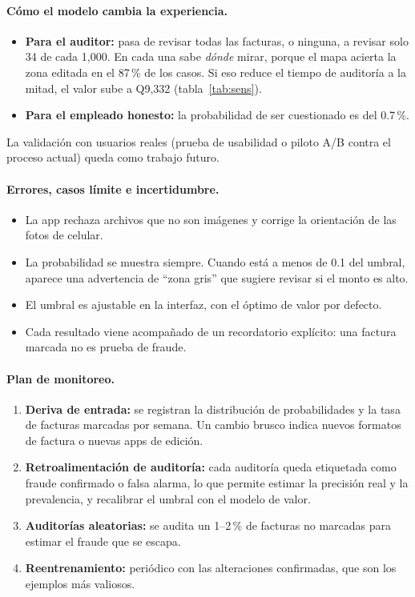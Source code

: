 \documentclass[11pt,letterpaper]{article}
\begin{document}
\paragraph{Cómo el modelo cambia la experiencia.}
\begin{itemize}
  \item \textbf{Para el auditor:} pasa de revisar todas las facturas, o ninguna, a revisar solo 34 de cada 1,000. En cada una sabe \emph{dónde} mirar, porque el mapa acierta la zona editada en el 87\,\% de los casos. Si eso reduce el tiempo de auditoría a la mitad, el valor sube a Q9,332 (tabla~\ref{tab:sens}).
  \item \textbf{Para el empleado honesto:} la probabilidad de ser cuestionado es del 0.7\,\%.
\end{itemize}
La validación con usuarios reales (prueba de usabilidad o piloto A/B contra el proceso actual) queda como trabajo futuro.

\paragraph{Errores, casos límite e incertidumbre.}
\begin{itemize}
  \item La app rechaza archivos que no son imágenes y corrige la orientación de las fotos de celular.
  \item La probabilidad se muestra siempre. Cuando está a menos de 0.1 del umbral, aparece una advertencia de ``zona gris'' que sugiere revisar si el monto es alto.
  \item El umbral es ajustable en la interfaz, con el óptimo de valor por defecto.
  \item Cada resultado viene acompañado de un recordatorio explícito: una factura marcada no es prueba de fraude.
\end{itemize}

\paragraph{Plan de monitoreo.}
\begin{enumerate}
  \item \textbf{Deriva de entrada:} se registran la distribución de probabilidades y la tasa de facturas marcadas por semana. Un cambio brusco indica nuevos formatos de factura o nuevas apps de edición.
  \item \textbf{Retroalimentación de auditoría:} cada auditoría queda etiquetada como fraude confirmado o falsa alarma, lo que permite estimar la precisión real y la prevalencia, y recalibrar el umbral con el modelo de valor.
  \item \textbf{Auditorías aleatorias:} se audita un 1--2\,\% de facturas no marcadas para estimar el fraude que se escapa.
  \item \textbf{Reentrenamiento:} periódico con las alteraciones confirmadas, que son los ejemplos más valiosos.
\end{enumerate}
\end{document}
